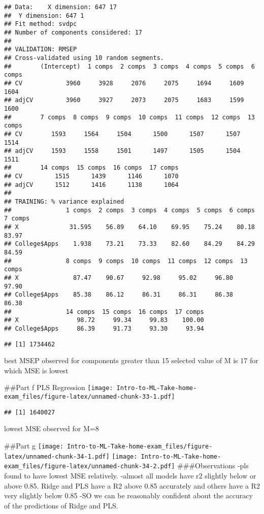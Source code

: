 \documentclass[
]{article}
\begin{document}
\begin{verbatim}
## Data:    X dimension: 647 17 
##  Y dimension: 647 1
## Fit method: svdpc
## Number of components considered: 17
## 
## VALIDATION: RMSEP
## Cross-validated using 10 random segments.
##        (Intercept)  1 comps  2 comps  3 comps  4 comps  5 comps  6 comps
## CV            3960     3928     2076     2075     1694     1609     1604
## adjCV         3960     3927     2073     2075     1683     1599     1600
##        7 comps  8 comps  9 comps  10 comps  11 comps  12 comps  13 comps
## CV        1593     1564     1504      1500      1507      1507      1514
## adjCV     1593     1558     1501      1497      1505      1504      1511
##        14 comps  15 comps  16 comps  17 comps
## CV         1515      1439      1146      1070
## adjCV      1512      1416      1138      1064
## 
## TRAINING: % variance explained
##               1 comps  2 comps  3 comps  4 comps  5 comps  6 comps  7 comps
## X              31.595    56.89    64.10    69.95    75.24    80.18    83.97
## College$Apps    1.938    73.21    73.33    82.60    84.29    84.29    84.59
##               8 comps  9 comps  10 comps  11 comps  12 comps  13 comps
## X               87.47    90.67     92.98     95.02     96.80     97.90
## College$Apps    85.38    86.12     86.31     86.31     86.38     86.38
##               14 comps  15 comps  16 comps  17 comps
## X                98.72     99.34     99.83    100.00
## College$Apps     86.39     91.73     93.30     93.94
\end{verbatim}

\begin{verbatim}
## [1] 1734462
\end{verbatim}

best MSEP observed for components greater than 15 selected value of M is
17 for which MSE is lowest

\#\#Part f PLS Regression
\texttt{[image: Intro-to-ML-Take-home-exam\_files/figure-latex/unnamed-chunk-33-1.pdf]}

\begin{verbatim}
## [1] 1640027
\end{verbatim}

lowest MSE observed for M=8

\#\#Part g
\texttt{[image: Intro-to-ML-Take-home-exam\_files/figure-latex/unnamed-chunk-34-1.pdf]}
\texttt{[image: Intro-to-ML-Take-home-exam\_files/figure-latex/unnamed-chunk-34-2.pdf]}
\#\#\#Observations -pls found to have lowest MSE relatively. -almost all
models have r2 slightly below or above 0.85. Ridge and PLS have a R2
above 0.85 accurately and others have a R2 very slightly below 0.85 -SO
we can be reasonably confident about the accuracy of the predictions of
Ridge and PLS.
\end{document}
